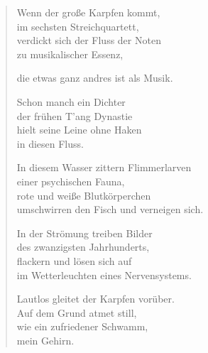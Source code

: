 
\cleartoverso

{\setlength{\stanzaskip}{0.5em}


\vspace*{-0.5\onelineskip}
\begin{verse}

Wenn der große Karpfen kommt,\\
im sechsten Streichquartett,\\
verdickt sich der Fluss der Noten\\
zu musikalischer Essenz,

die etwas ganz andres ist als Musik.

Schon manch ein Dichter\\
der frühen T'ang Dynastie\\
hielt seine Leine ohne Haken\\
in diesen Fluss.

In diesem Wasser zittern Flimmerlarven\\
einer psychischen Fauna,\\
rote und weiße Blutkörperchen\\
umschwirren den Fisch und verneigen sich.

In der Strömung treiben Bilder\\
des zwanzigsten Jahrhunderts,\\
flackern und lösen sich auf\\
im Wetterleuchten eines Nervensystems.

Lautlos gleitet der Karpfen vorüber.\\
Auf dem Grund atmet still,\\
wie ein zufriedener Schwamm,\\
mein Gehirn.

\end{verse}

}

\clearpage

